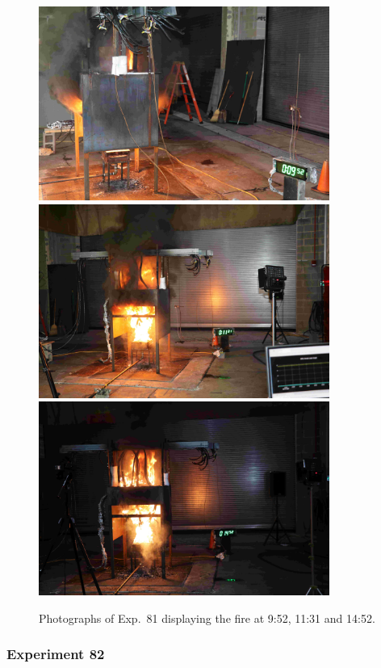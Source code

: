 \begin{figure}[p]
\centering
\includegraphics[height=2.50in]{../FIGURES/Test_81_Photo_1} \\ \vspace{0.1in}
\includegraphics[height=2.50in]{../FIGURES/Test_81_Photo_2} \\ \vspace{0.1in}
\includegraphics[height=2.50in]{../FIGURES/Test_81_Photo_3}
\caption[Photographs of Exp.~81]{Photographs of Exp.~81 displaying the fire at 9:52, 11:31 and 14:52.}
\label{fig:Test_81_photos}
\end{figure}


\clearpage

\subsubsection{Experiment 82}

